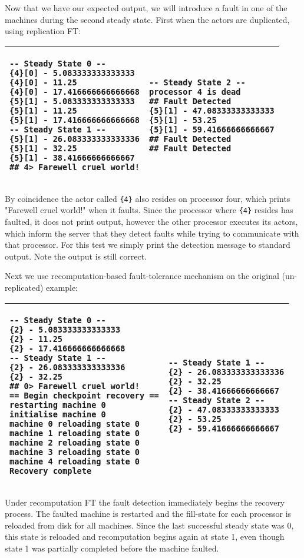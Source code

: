 Now that we have our expected output, we will introduce a fault in one of the machines during the second steady state.
First when the actors are duplicated, using replication FT:
\begin{center}
\begin{tabular}{ | p{5cm} p{5cm} | }
	\hline
	\begin{verbatim}
-- Steady State 0 --
{4}[0] - 5.083333333333333
{4}[0] - 11.25
{4}[0] - 17.416666666666668
{5}[1] - 5.083333333333333
{5}[1] - 11.25
{5}[1] - 17.416666666666668
-- Steady State 1 --
{5}[1] - 26.083333333333336
{5}[1] - 32.25
{5}[1] - 38.41666666666667
## 4> Farewell cruel world!
	\end{verbatim}
	&
	\begin{verbatim}
-- Steady State 2 --
processor 4 is dead
## Fault Detected
{5}[1] - 47.08333333333333
{5}[1] - 53.25
{5}[1] - 59.41666666666667
## Fault Detected
## Fault Detected
	\end{verbatim}
	\\ \hline
\end{tabular}
\end{center}
\noindent By coincidence the actor called \verb={4}= also resides on processor four, which prints "Farewell cruel world!" when it faults.
Since the processor where \verb={4}= resides has faulted, it does not print output, however the other processor executes its actors, which inform the server that they detect faults while trying to communicate with that processor.
For this test we simply print the detection message to standard output.
Note the output is still correct.

Next we use recomputation-based fault-tolerance mechanism on the original (un-replicated) example:
\begin{center}
\begin{tabular}{ | p{5cm} p{5cm} | }
	\hline
	\begin{verbatim}
-- Steady State 0 --
{2} - 5.083333333333333
{2} - 11.25
{2} - 17.416666666666668
-- Steady State 1 --
{2} - 26.083333333333336
{2} - 32.25
## 0> Farewell cruel world!
== Begin checkpoint recovery ==
restarting machine 0
initialise machine 0
machine 0 reloading state 0
machine 1 reloading state 0
machine 2 reloading state 0
machine 3 reloading state 0
machine 4 reloading state 0
Recovery complete
	\end{verbatim}
	&
	\begin{verbatim}
-- Steady State 1 --
{2} - 26.083333333333336
{2} - 32.25
{2} - 38.41666666666667
-- Steady State 2 --
{2} - 47.08333333333333
{2} - 53.25
{2} - 59.41666666666667
	\end{verbatim}
	\\ \hline
\end{tabular}
\end{center}
\noindent Under recomputation FT the fault detection immediately begins the recovery process.
The faulted machine is restarted and the fill-state for each processor is reloaded from disk for all machines.
Since the last successful steady state was 0, this state is reloaded and recomputation begins again at state 1, even though state 1 was partially completed before the machine faulted.


